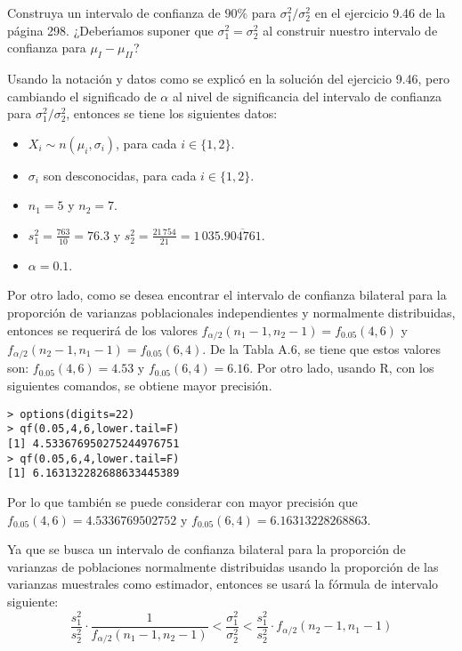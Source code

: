 \begin{enunciado}
 Construya un intervalo de confianza de $90\%$ para $\sigma_1^2/\sigma_2^2$ en el ejercicio 9.46 de la p\'agina 298. ¿Deber\'{\i}amos suponer que $\sigma_1^2 = \sigma_2^2$ al construir nuestro intervalo de confianza para $\mu_I - \mu_{II}$?
\end{enunciado}

\begin{solucion}
 Usando la notaci\'on y datos como se explic\'o en la soluci\'on del ejercicio 9.46, pero cambiando el significado de $\alpha$ al nivel de significancia del intervalo de confianza para $\sigma_1^2/\sigma_2^2$, entonces se tiene los siguientes datos:
 \begin{itemize}
  \item $X_i \sim n\left( \mu_i, \sigma_i \right)$, para cada $i \in \{ 1, 2 \}$.
  \item $\sigma_i$ son desconocidas, para cada $i \in \{ 1, 2 \}$.
  \item $n_1 = 5$ y $n_2 = 7$.
  \item $s_1^2 = \frac{763}{10} = 76.3$ y $s_2^2 = \frac{21\,754}{21} = 1\,035.\overline{904761}$.
  \item $\alpha = 0.1$.
 \end{itemize}
 Por otro lado, como se desea encontrar el intervalo de confianza bilateral para la proporci\'on de varianzas poblacionales independientes y normalmente distribuidas, entonces se requerir\'a de los valores $f_{\alpha/2}(n_1-1,n_2-1) = f_{0.05}(4,6)$ y $f_{\alpha/2}(n_2-1,n_1-1) = f_{0.05}(6,4)$. De la Tabla A.6, se tiene que estos valores son: $f_{0.05}(4,6) = 4.53$ y $f_{0.05}(6,4) = 6.16$. Por otro lado, usando R, con los siguientes comandos, se obtiene mayor precisi\'on.
 \begin{verbatim}
> options(digits=22)
> qf(0.05,4,6,lower.tail=F)
[1] 4.533676950275244976751
> qf(0.05,6,4,lower.tail=F)
[1] 6.163132282688633445389
 \end{verbatim}
 \vspace{-0.5cm}
 Por lo que tambi\'en se puede considerar con mayor precisi\'on que $f_{0.05}(4,6) = 4.5336769502752$ y $f_{0.05}(6,4) = 6.16313228268863$.
 \par 
 Ya que se busca un intervalo de confianza bilateral para la proporci\'on de varianzas de poblaciones normalmente distribuidas usando la proporci\'on de las varianzas muestrales como estimador, entonces se usar\'a la f\'ormula de intervalo siguiente:
 \begin{equation*}
  \frac{s_1^2}{s_2^2}\cdot \frac{1}{f_{\alpha/2}(n_1-1,n_2-1)} < \frac{\sigma_1^2}{\sigma_2^2} < \frac{s_1^2}{s_2^2}\cdot f_{\alpha/2}(n_2-1,n_1-1)

\end{equation*}
\end{solucion}
